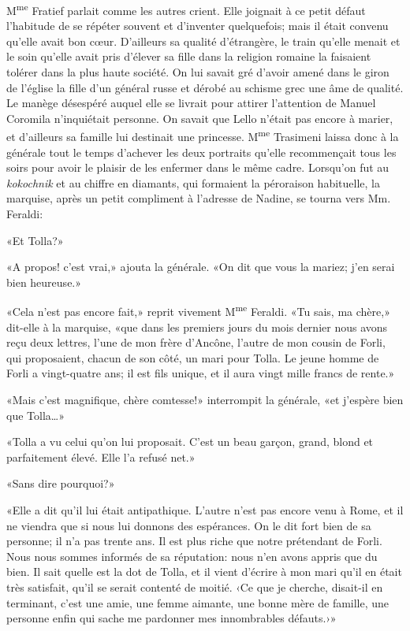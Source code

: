 M\textsuperscript{me} Fratief parlait comme les autres crient. Elle
joignait à ce petit défaut l'habitude de se répéter souvent et
d'inventer quelquefois; mais il était convenu qu'elle avait bon cœur.
D'ailleurs sa qualité d'étrangère, le train qu'elle menait et le soin
qu'elle avait pris d'élever sa fille dans la religion romaine la
faisaient tolérer dans la plus haute société. On lui savait gré d'avoir
amené dans le giron de l'église la fille d'un général russe et dérobé au
schisme grec une âme de qualité. Le manège désespéré auquel elle se
livrait pour attirer l'attention de Manuel Coromila n'inquiétait
personne. On savait que Lello n'était pas encore à marier, et d'ailleurs
sa famille lui destinait une princesse. M\textsuperscript{me} Trasimeni
laissa donc à la générale tout le temps d'achever les deux portraits
qu'elle recommençait tous les soirs pour avoir le plaisir de les
enfermer dans le même cadre. Lorsqu'on fut au \emph{kokochnik} et au
chiffre en diamants, qui formaient la péroraison habituelle, la
marquise, après un petit compliment à l'adresse de Nadine, se tourna
vers Mm. Feraldi:

«Et Tolla?»

«A propos! c'est vrai,» ajouta la générale. «On dit que vous la
mariez; j'en serai bien heureuse.»

«Cela n'est pas encore fait,» reprit vivement M\textsuperscript{me}
Feraldi. «Tu sais, ma chère,» dit-elle à la marquise, «que dans les
premiers jours du mois dernier nous avons reçu deux lettres, l'une de
mon frère d'Ancône, l'autre de mon cousin de Forli, qui proposaient,
chacun de son côté, un mari pour Tolla. Le jeune homme de Forli a
vingt-quatre ans; il est fils unique, et il aura vingt mille francs de
rente.»

«Mais c'est magnifique, chère comtesse!» interrompit la générale,
«et j'espère bien que Tolla\ldots»

«Tolla a vu celui qu'on lui proposait. C'est un beau garçon, grand,
blond et parfaitement élevé. Elle l'a refusé net.»

«Sans dire pourquoi?»

«Elle a dit qu'il lui était antipathique. L'autre n'est pas encore
venu à Rome, et il ne viendra que si nous lui donnons des espérances. On
le dit fort bien de sa personne; il n'a pas trente ans. Il est plus
riche que notre prétendant de Forli. Nous nous sommes informés de sa
réputation: nous n'en avons appris que du bien. Il sait quelle est la
dot de Tolla, et il vient d'écrire à mon mari qu'il en était très
satisfait, qu'il se serait contenté de moitié. ‹Ce que je cherche,
disait-il en terminant, c'est une amie, une femme aimante, une bonne
mère de famille, une personne enfin qui sache me pardonner mes
innombrables défauts.›»

